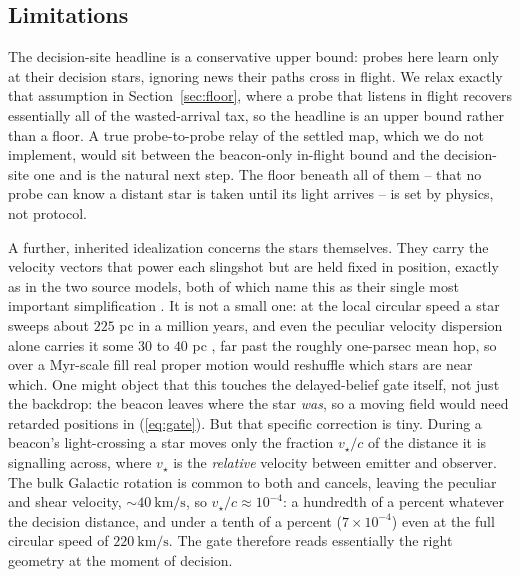 \subsection{Limitations}
\label{sec:limitations}
The decision-site headline is a conservative upper bound: probes here learn only at their decision
stars, ignoring news their paths cross in flight. We relax exactly that assumption in
Section~\ref{sec:floor}, where a probe that listens in flight recovers essentially all of the
wasted-arrival tax, so the headline is an upper bound rather than a floor. A true probe-to-probe
relay of the settled map, which we do not implement, would sit between the beacon-only in-flight
bound and the decision-site one and is the natural next step. The floor beneath all of them -- that
no probe can know a distant star is taken until its light arrives -- is set by physics, not
protocol.

A further, inherited idealization concerns the stars themselves. They carry the velocity vectors
that power each slingshot but are held fixed in position, exactly as in the two source models,
both of which name this as their single most important simplification
\citep{nicholson-forgan-2013,forgan-papadog-kitching-2013}. It is not a small one: at the local
circular speed a star sweeps about $225$ pc in a million years, and even the peculiar velocity
dispersion alone carries it some $30$ to $40$ pc \citep{kerr-lynden-bell-1986,nordstrom-2004-gcs},
far past the roughly one-parsec mean hop, so over a Myr-scale fill real proper motion would
reshuffle which stars are near which. One might object that this touches the delayed-belief gate
itself, not just the backdrop: the beacon leaves where the star \emph{was}, so a moving field would
need retarded positions in (\ref{eq:gate}). But that specific correction is tiny. During a beacon's light-crossing a star moves only the
fraction $v_\star/c$ of the distance it is signalling across, where $v_\star$ is the \emph{relative}
velocity between emitter and observer. The bulk Galactic rotation is common to both and cancels,
leaving the peculiar and shear velocity, $\sim\!40~\mathrm{km/s}$, so $v_\star/c \approx 10^{-4}$: a
hundredth of a percent whatever the decision distance, and under a tenth of a percent
($7\times10^{-4}$) even at the full circular speed of $220~\mathrm{km/s}$. The gate therefore reads
essentially the right geometry at the moment of decision.

